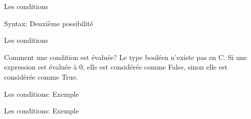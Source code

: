 \documentclass{beamer}
\begin{document}
\begin{darkframes}
	\begin{frame}{Les conditions}
		  		\begin{block}{Syntax: Deuxième possibilité}
			\ifelsemulti
		\end{block}
	\end{frame}




	\begin{frame}{Les conditions}
		\begin{block}{Comment une condition est évaluée?}
			Le type \alert{booléen } n'existe pas en C. Si une expression est évaluée à 0, elle est considérée comme \alert{False}, sinon elle est considérée comme \alert{True}.
		\end{block}
	\end{frame}

	\begin{frame}{Les conditions: Exemple}	
		\begin{center}
			\begin{minipage}[t]{0.48\linewidth}
				\ifexampleone
			\end{minipage}
			\qquad
			\begin{minipage}[t]{0.48\linewidth}
				\ifexampletwo
			\end{minipage}
			\begin{minipage}[t]{0.48\linewidth}
				\ifexamplethree
			\end{minipage}
		\end{center}
	\end{frame}

	\begin{frame}{Les conditions: Exemple}	
		\ifexampleone
		\ifexampletwo
		\ifexamplethree
	\end{frame}


\end{darkframes}
\end{document}
